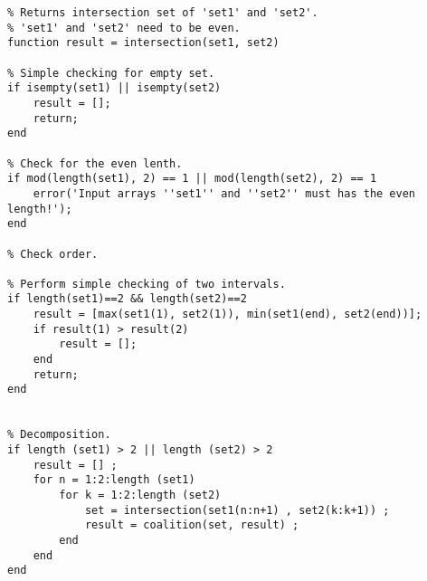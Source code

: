 \begin{verbatim}
% Returns intersection set of 'set1' and 'set2'.
% 'set1' and 'set2' need to be even.
function result = intersection(set1, set2)

% Simple checking for empty set.
if isempty(set1) || isempty(set2)
	result = [];
	return;
end

% Check for the even lenth.
if mod(length(set1), 2) == 1 || mod(length(set2), 2) == 1
	error('Input arrays ''set1'' and ''set2'' must has the even length!');
end

% Check order.

% Perform simple checking of two intervals.
if length(set1)==2 && length(set2)==2
	result = [max(set1(1), set2(1)), min(set1(end), set2(end))];
	if result(1) > result(2)
		result = [];
	end
	return;
end


% Decomposition.
if length (set1) > 2 || length (set2) > 2
    result = [] ;
    for n = 1:2:length (set1)
        for k = 1:2:length (set2)
            set = intersection(set1(n:n+1) , set2(k:k+1)) ;
            result = coalition(set, result) ;
        end
    end
end
\end{verbatim}
